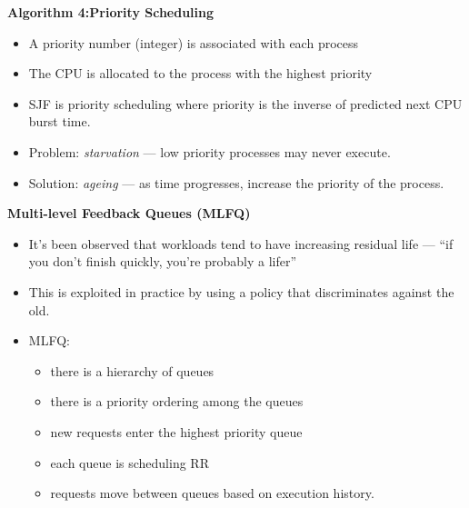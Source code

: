 \documentclass[11pt,a4paper]{article}
\begin{document}
\textbf{Algorithm 4:\@ Priority Scheduling}
\begin{itemize}
    \item A priority number (integer) is associated with each process
    \item The CPU is allocated to the process with the highest priority
    \item SJF is priority scheduling where priority is the inverse of predicted next CPU
        burst time.
    \item Problem: \emph{starvation} --- low priority processes may never execute.
    \item Solution: \emph{ageing} --- as time progresses, increase the priority of the process.
\end{itemize}

\textbf{Multi-level Feedback Queues (MLFQ)}
\begin{itemize}
    \item It's been observed that workloads tend to have increasing residual life ---
        ``if you don't finish quickly, you're probably a lifer''
    \item This is exploited in practice by using a policy that discriminates against the old.
    \item MLFQ:\@
        \begin{itemize}
            \item there is a hierarchy of queues
            \item there is a priority ordering among the queues
            \item new requests enter the highest priority queue
            \item each queue is scheduling RR
            \item requests move between queues based on execution history.
        \end{itemize}
\end{itemize}
\end{document}
